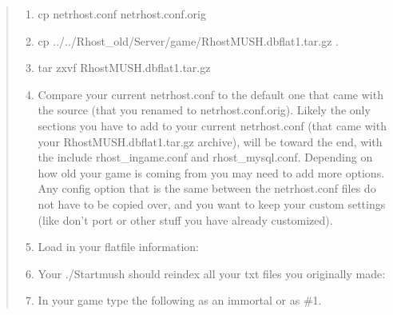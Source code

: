 \documentclass[letterpaper,10pt,english]{sphinxmanual}
\begin{document}
\begin{quote}
\begin{enumerate}
%
\item {} 
\sphinxAtStartPar
cp netrhost.conf netrhost.conf.orig

\item {} 
\sphinxAtStartPar
cp ../../Rhost\_old/Server/game/RhostMUSH.dbflat1.tar.gz .

\item {} 
\sphinxAtStartPar
tar \sphinxhyphen{}zxvf RhostMUSH.dbflat1.tar.gz

\item {} 
\sphinxAtStartPar
Compare your current netrhost.conf to the default one that came with the source (that you renamed to netrhost.conf.orig).  Likely the only sections you have to add to your current netrhost.conf (that came with your RhostMUSH.dbflat1.tar.gz archive), will be toward the end, with the include rhost\_ingame.conf and rhost\_mysql.conf.  Depending on how old your game is coming from you may need to add more options.  Any config option that is the same between the netrhost.conf files do not have to be copied over, and you want to keep your custom settings (like don’t port or other stuff you have already customized).

\item {} 
\sphinxAtStartPar
Load in your flatfile information:

\begin{sphinxVerbatim}[commandchars=\\\{\}]
   
\end{sphinxVerbatim}

\item {} 
\sphinxAtStartPar
Your ./Startmush should re\sphinxhyphen{}index all your txt files you originally made:

\begin{sphinxVerbatim}[commandchars=\\\{\}]
\end{sphinxVerbatim}

\item {} 
\sphinxAtStartPar
In your game type the following as an immortal or as \#1.


\end{enumerate}
\end{quote}
\end{document}

